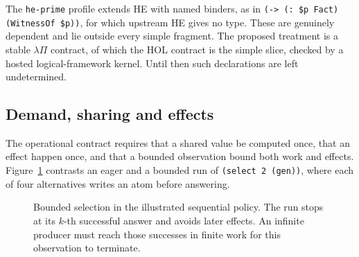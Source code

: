 \documentclass[11pt]{article}
\theoremstyle{definition}
\theoremstyle{remark}
\newcommand{\code}[1]{\texttt{#1}}
\begin{document}
The \code{he-prime} profile extends HE with named binders, as in
\code{(-> (: \$p Fact) (WitnessOf \$p))}, for which upstream HE gives no type.
These are genuinely dependent and lie outside every simple fragment. The proposed treatment is a stable $\lambda\Pi$
contract, of which the HOL contract is the simple slice, checked by a hosted
logical-framework kernel. Until then such declarations are left undetermined.

\subsection{Demand, sharing and effects}
\label{sec:demand-effects}

The operational contract requires that a shared value be computed once, that an
effect happen once, and that a bounded observation bound both work and effects.
Figure~\ref{fig:select-timeline} contrasts an eager and a bounded run of
\code{(select 2 (gen))}, where each of four alternatives writes an atom before
answering.

\begin{figure}[ht]
\centering
{}
\caption{Bounded selection in the illustrated sequential policy. The run stops
at its $k$-th successful answer and avoids later effects. An infinite producer
must reach those successes in finite work for this observation to terminate.}
\label{fig:select-timeline}
\end{figure}
\end{document}
